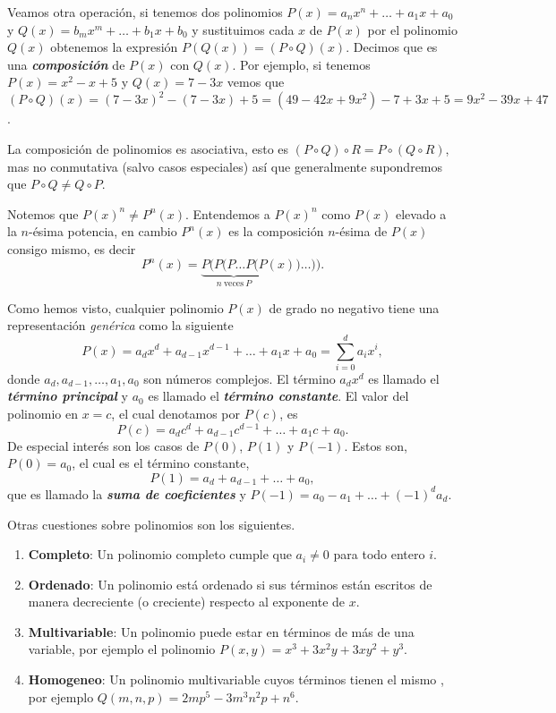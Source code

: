 Veamos otra operación, si tenemos dos polinomios $P(x) = a_n x^n + \ldots + a_1 x + a_0$ y $Q(x) = b_m x^m + \ldots + b_1 x + b_0$ y sustituimos cada $x$ de $P(x)$ por el polinomio $Q(x)$ obtenemos la expresión $P\left(Q(x)\right) = (P \circ Q)(x)$.
Decimos que es una \textbf{\emph{composición}} de $P(x)$ con $Q(x)$.
Por ejemplo, si tenemos $P(x) = x^2 - x + 5$ y $Q(x) = 7 - 3x$ vemos que $(P \circ Q)(x) = (7 - 3x)^2 - (7 - 3x) + 5 = (49 - 42x + 9x^2) - 7 + 3x + 5 = 9x^2 - 39x + 47$.

La composición de polinomios es asociativa, esto es $(P \circ Q) \circ R = P \circ (Q \circ R)$, mas no conmutativa (salvo casos especiales) así que generalmente supondremos que $P \circ Q \neq  Q \circ P$.
\\
\begin{remark.tcb}
    Notemos que $P(x)^n \neq P^n(x)$.
    Entendemos a $P(x)^n$ como $P(x)$ elevado a la $n$-ésima potencia, en cambio $P^n(x)$ es la composición $n$-ésima de $P(x)$ consigo mismo, es decir
    \[
        P^n(x) = \underbrace{P(P(P\dots P(P}_{n\ \text{veces}\ P} (x))\dots)).
    \]
\end{remark.tcb}

Como hemos visto, cualquier polinomio $P(x)$ de grado no negativo tiene una representación \textit{genérica} como la siguiente
\[
    P(x) = a_d x^d + a_{d - 1} x^{d - 1} + \ldots + a_1 x + a_0 = \sum_{i = 0}^{d} a_i x^i,
\]
donde $a_d, a_{d - 1}, \ldots, a_1, a_0$ son números complejos.
El término $a_d x^d$ es llamado el \textbf{\emph{término principal}} y $a_0$ es llamado el \textbf{\emph{término constante}}.
El valor del polinomio en $x = c$, el cual denotamos por $P(c)$, es
\[
    P(c) = a_d c^d + a_{d - 1}c^{d - 1} + \ldots + a_1 c + a_0.
\]
De especial interés son los casos de $P(0)$, $P(1)$ y $P(-1)$.
Estos son, $P(0) = a_0$, el cual es el término constante,
\[
    P(1) = a_d + a_{d - 1} + \ldots + a_0,
\]
que es llamado la \textbf{\emph{suma de coeficientes}} y $P(-1) = a_0 - a_1 + \ldots + (-1)^d a_d.$

Otras cuestiones sobre polinomios son los siguientes.
\begin{enumerate}
    \item \textbf{Completo}: Un polinomio completo cumple que $a_i \neq 0$ para todo entero $i$.
    \item \textbf{Ordenado}: Un polinomio está ordenado si sus términos están escritos de manera decreciente (o creciente) respecto al exponente de $x$.
    \item \textbf{Multivariable}: Un polinomio puede estar en términos de más de una variable, por ejemplo el polinomio $P(x, y) = x^3 + 3x^2 y + 3xy^2 + y^3$.
    \item \textbf{Homogeneo}: Un polinomio multivariable cuyos términos tienen el mismo , por ejemplo $Q(m, n, p) = 2m p^5 - 3m^3 n^2 p + n^6$.
\end{enumerate}

